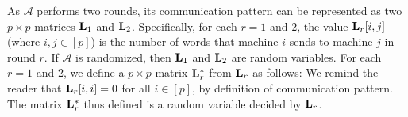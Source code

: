 \documentclass[sigconf]{acmart}
\def\vgap{\vspace{0mm}}
\def\A{\mathcal{A}}
\begin{document}
\vgap

As $\A$ performs two rounds, its communication pattern can be represented as two $p \times p$ matrices $\mathbf{L}_1$ and $\mathbf{L}_2$. Specifically, for each $r = 1$ and $2$, the value $\mathbf{L}_r[i, j]$ (where $i, j \in [p]$) is the number of words that machine $i$ sends to machine $j$ in round $r$. If $\A$ is randomized, then $\mathbf{L}_1$ and $\mathbf{L}_2$ are random variables. For each $r =1$ and 2, we define a $p \times p$ matrix $\mathbf{L}^*_r$ from $\mathbf{L}_r$ as follows:
We remind the reader that $\mathbf{L}_r[i,i] = 0$ for all $i \in [p]$, by definition of communication pattern. The matrix $\mathbf{L}^*_r$ thus defined is a random variable decided by $\mathbf{L}_r$.

\vgap
\end{document}
